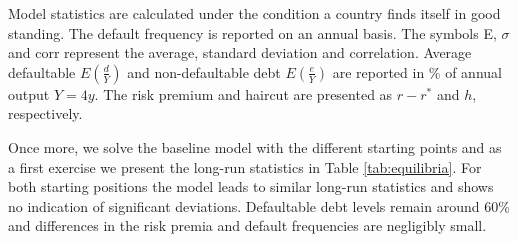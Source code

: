 \begin{table}[H]\Large
\setlength{\arrayrulewidth}{0.3mm}
\centering
   \caption{\textbf{Multiplicity of Equilibria}}
    \label{tab:equilibria}
    \vspace{1mm}
    \begin{tablenotes}
      \footnotesize
      \item Model statistics are calculated under the condition a country finds itself in good standing. The default frequency is reported on an annual basis. The symbols E, $\sigma$ and corr represent the average, standard deviation and correlation. Average defaultable $E(\frac{d}{Y})$ and non-defaultable debt $E(\frac{e}{Y})$ are reported in \% of annual output $Y = 4y$. The risk premium and haircut are presented as $r-r^*$ and $h$, respectively.
    \end{tablenotes}
\end{table}
Once more, we solve the baseline model with the different starting points and as a first exercise we present the long-run statistics in Table \ref{tab:equilibria}. For both starting positions the model leads to similar long-run statistics and shows no indication of significant deviations. Defaultable debt levels remain around 60\% and differences in the risk premia and default frequencies are negligibly small.\\

